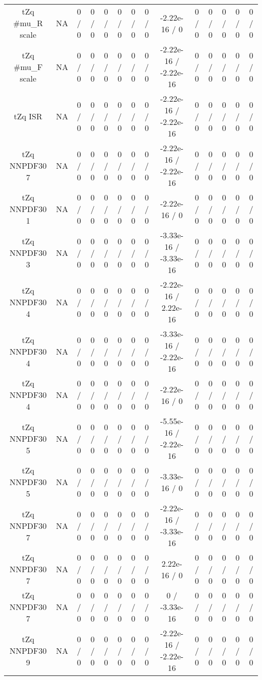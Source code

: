 \documentclass[10pt]{article}
\begin{document}
\begin{table}[htbp]
\begin{center}
\begin{tabular}{|c|c|c|c|c|c|c|c|c|c|c|c|c|c|}
  tZq #mu_{R} scale &    NA    & 0 / 0 & 0 / 0 & 0 / 0 & 0 / 0 & 0 / 0 & 0 / 0 & -2.22e-16 / 0 & 0 / 0 & 0 / 0 & 0 / 0 & 0 / 0 & 0 / 0 \\ 
  tZq #mu_{F} scale &    NA    & 0 / 0 & 0 / 0 & 0 / 0 & 0 / 0 & 0 / 0 & 0 / 0 & -2.22e-16 / -2.22e-16 & 0 / 0 & 0 / 0 & 0 / 0 & 0 / 0 & 0 / 0 \\ 
  tZq ISR &    NA    & 0 / 0 & 0 / 0 & 0 / 0 & 0 / 0 & 0 / 0 & 0 / 0 & -2.22e-16 / -2.22e-16 & 0 / 0 & 0 / 0 & 0 / 0 & 0 / 0 & 0 / 0 \\ 
  tZq NNPDF30 7 &    NA    & 0 / 0 & 0 / 0 & 0 / 0 & 0 / 0 & 0 / 0 & 0 / 0 & -2.22e-16 / -2.22e-16 & 0 / 0 & 0 / 0 & 0 / 0 & 0 / 0 & 0 / 0 \\ 
  tZq NNPDF30 1 &    NA    & 0 / 0 & 0 / 0 & 0 / 0 & 0 / 0 & 0 / 0 & 0 / 0 & -2.22e-16 / 0 & 0 / 0 & 0 / 0 & 0 / 0 & 0 / 0 & 0 / 0 \\ 
  tZq NNPDF30 3 &    NA    & 0 / 0 & 0 / 0 & 0 / 0 & 0 / 0 & 0 / 0 & 0 / 0 & -3.33e-16 / -3.33e-16 & 0 / 0 & 0 / 0 & 0 / 0 & 0 / 0 & 0 / 0 \\ 
  tZq NNPDF30 4 &    NA    & 0 / 0 & 0 / 0 & 0 / 0 & 0 / 0 & 0 / 0 & 0 / 0 & -2.22e-16 / 2.22e-16 & 0 / 0 & 0 / 0 & 0 / 0 & 0 / 0 & 0 / 0 \\ 
  tZq NNPDF30 4 &    NA    & 0 / 0 & 0 / 0 & 0 / 0 & 0 / 0 & 0 / 0 & 0 / 0 & -3.33e-16 / -2.22e-16 & 0 / 0 & 0 / 0 & 0 / 0 & 0 / 0 & 0 / 0 \\ 
  tZq NNPDF30 4 &    NA    & 0 / 0 & 0 / 0 & 0 / 0 & 0 / 0 & 0 / 0 & 0 / 0 & -2.22e-16 / 0 & 0 / 0 & 0 / 0 & 0 / 0 & 0 / 0 & 0 / 0 \\ 
  tZq NNPDF30 5 &    NA    & 0 / 0 & 0 / 0 & 0 / 0 & 0 / 0 & 0 / 0 & 0 / 0 & -5.55e-16 / -2.22e-16 & 0 / 0 & 0 / 0 & 0 / 0 & 0 / 0 & 0 / 0 \\ 
  tZq NNPDF30 5 &    NA    & 0 / 0 & 0 / 0 & 0 / 0 & 0 / 0 & 0 / 0 & 0 / 0 & -3.33e-16 / 0 & 0 / 0 & 0 / 0 & 0 / 0 & 0 / 0 & 0 / 0 \\ 
  tZq NNPDF30 7 &    NA    & 0 / 0 & 0 / 0 & 0 / 0 & 0 / 0 & 0 / 0 & 0 / 0 & -2.22e-16 / -3.33e-16 & 0 / 0 & 0 / 0 & 0 / 0 & 0 / 0 & 0 / 0 \\ 
  tZq NNPDF30 7 &    NA    & 0 / 0 & 0 / 0 & 0 / 0 & 0 / 0 & 0 / 0 & 0 / 0 & 2.22e-16 / 0 & 0 / 0 & 0 / 0 & 0 / 0 & 0 / 0 & 0 / 0 \\ 
  tZq NNPDF30 7 &    NA    & 0 / 0 & 0 / 0 & 0 / 0 & 0 / 0 & 0 / 0 & 0 / 0 & 0 / -3.33e-16 & 0 / 0 & 0 / 0 & 0 / 0 & 0 / 0 & 0 / 0 \\ 
  tZq NNPDF30 9 &    NA    & 0 / 0 & 0 / 0 & 0 / 0 & 0 / 0 & 0 / 0 & 0 / 0 & -2.22e-16 / -2.22e-16 & 0 / 0 & 0 / 0 & 0 / 0 & 0 / 0 & 0 / 0 \\ 

\end{tabular}
\end{center}
\end{table}
\end{document}
